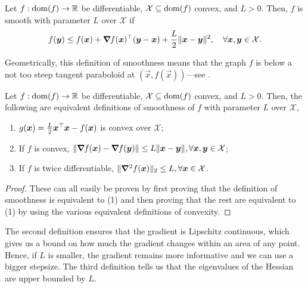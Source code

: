 \begin{definition}[Smoothness] \label{def:smoothness}
    Let $f: \mathrm{dom}(f) \to \mathbb{R}$ be differentiable, $\mathcal{X} \subseteq \mathrm{dom}(f)$ convex, and $L > 0$.
    Then, $f$ is smooth with parameter $L$ over $\mathcal{X}$ if \[
        f(\bm{y}) \leq f(\bm{x}) + \bm{\nabla}_{\! } f(\bm{x})^\top (\bm{y}-\bm{x}) + \frac{L}{2} \|\bm{x}-\bm{y}\|^2, \quad \forall \bm{x}, \bm{y} \in \mathcal{X}.
    \]
\end{definition}

Geometrically, this definition of smoothness means that the graph $f$ is below a not too steep
tangent paraboloid at $(\vec{x},f(\vec{x}))$---see .

\begin{lemma}
    Let $f: \mathrm{dom}(f) \to \mathbb{R}$ be differentiable, $\mathcal{X} \subseteq \mathrm{dom}(f)$ convex, and $L > 0$.
    Then, the following are equivalent definitions of smoothness of $f$ with parameter $L$ over $\mathcal{X}$,
    \begin{enumerate}
        \item $g(\bm{x}) = \frac{L}{2} \bm{x}^\top \bm{x} - f(\bm{x})$ is convex over $\mathcal{X}$;
        \item If $f$ is convex, $\| \bm{\nabla}_{\! } f(\bm{x}) - \bm{\nabla}_{\! } f(\bm{y}) \| \leq L \| \bm{x} - \bm{y} \|,
                  \forall \bm{x}, \bm{y} \in \mathcal{X}$;
        \item If $f$ is twice differentiable, $\| \bm{\nabla}^2_{\! } f(\bm{x}) \|_2 \leq L, \forall \bm{x} \in
                  \mathcal{X}$.
    \end{enumerate}
\end{lemma}

\begin{proof}
    These can all easily be proven by first proving that the definition of smoothness is equivalent
    to (1) and then proving that the rest are equivalent to (1) by using the various equivalent
    definitions of convexity.
\end{proof}

The second definition ensures that the gradient is Lipschitz continuous, which gives us a bound on
how much the gradient changes within an area of any point. Hence, if $L$ is smaller, the gradient
remains more informative and we can use a bigger stepsize. The third definition tells us that the
eigenvalues of the Hessian are upper bounded by $L$.


